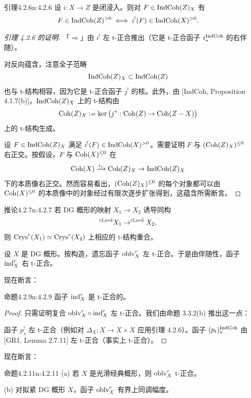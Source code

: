 \begin{othm}{引理}{4.2.6}{n:4.2.6}
设 $i:X\to Z$ 是闭浸入。则对 $F\in\mathrm{IndCoh}(Z)_X$ 有
\[
F\in\mathrm{IndCoh}(Z)^{>0}\iff i^!(F)\in\mathrm{IndCoh}(X)^{>0}.
\]
\end{othm}

\begin{proof}[引理 4.2.6 的证明]
「$\Rightarrow$」由 $i^!$ 左 t-正合推出（它是 t-正合函子 $i_*^{\mathrm{IndCoh}}$ 的右伴随）。

对反向蕴含，注意全子范畴
\[
\mathrm{IndCoh}(Z)_X\subset\mathrm{IndCoh}(Z)
\]
也与 t-结构相容，因为它是 t-正合函子 $j^!$ 的核。此外，由 [IndCoh, Proposition 4.1.7(b)]，$\mathrm{IndCoh}(Z)_X$ 上的 t-结构由
\[
\mathrm{Coh}(Z)_X:=\ker\big(j^*:\mathrm{Coh}(Z)\to\mathrm{Coh}(Z-X)\big)
\]
上的 t-结构生成。

设 $F\in\mathrm{IndCoh}(Z)_X$ 满足 $i^!(F)\in\mathrm{IndCoh}(X)^{>0}$。需要证明 $F$ 与 $(\mathrm{Coh}(Z)_X)^{\leq 0}$ 右正交。按假设，$F$ 与 $\mathrm{Coh}(X)^{\leq 0}$ 在
\[
\mathrm{Coh}(X)\xrightarrow{i_*}\mathrm{Coh}(Z)_X\to\mathrm{IndCoh}(Z)_X
\]
下的本质像右正交。然而容易看出，$(\mathrm{Coh}(Z)_X)^{\leq 0}$ 的每个对象都可以由 $\mathrm{Coh}(X)^{\leq 0}$ 的本质像中的对象经过有限次逐步扩张得到，这蕴含所需断言。
\end{proof}

\begin{othm}{推论}{4.2.7}{n:4.2.7}
若 DG 概形的映射 $X_1\to X_2$ 诱导同构
\[
^{\mathrm{cl,red}} X_1\to^{\mathrm{cl,red}} X_2,
\]
则 $\mathrm{Crys}^r(X_1)\simeq\mathrm{Crys}^r(X_2)$ 上相应的 t-结构重合。
\end{othm}

设 $X$ 是 DG 概形。按构造，遗忘函子 $\mathrm{oblv}^r_X$ 左 t-正合。于是由伴随性，函子 $\mathrm{ind}^r_X$ 右 t-正合。

现在断言：

\begin{othm}{命题}{4.2.9}{n:4.2.9}
函子 $\mathrm{ind}^r_X$ 是 t-正合的。
\end{othm}

\begin{proof}
只需证明复合 $\mathrm{oblv}^r_X\circ\mathrm{ind}^r_X$ 左 t-正合。我们由命题 3.3.2(b) 推出这一点：

函子 $p_s^!$ 左 t-正合（例如对 $\Delta_X:X\to X\times X$ 应用引理 4.2.6）。函子 $(p_t)_*^{\mathrm{IndCoh}}$ 由 [GR1, Lemma 2.7.11] 左 t-正合（事实上 t-正合）。
\end{proof}

现在断言：

\begin{othm}{命题}{4.2.11}{n:4.2.11}
(a) 若 $X$ 是光滑经典概形，则 $\mathrm{oblv}^r_X$ t-正合。

(b) 对拟紧 DG 概形 $X$，函子 $\mathrm{oblv}^r_X$ 有界上同调幅度。
\end{othm}

